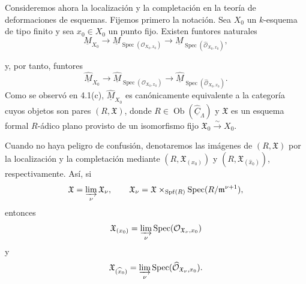 
Consideremos ahora la localización y la completación en la teoría de
deformaciones de esquemas. Fijemos primero la notación. Sea $X_0$ un
$k$-esquema de tipo finito y sea $x_0\in X_0$ un punto fijo. Existen
funtores naturales
\[
\underline M_{X_0}
\longrightarrow
\underline M_{\operatorname{Spec}(\mathcal O_{X_0,x_0})}
\longrightarrow
\underline M_{\operatorname{Spec}(\widehat{\mathcal O}_{X_0,x_0})},
\]


y, por tanto, funtores
\[
\widehat{\underline M}_{X_0}
\longrightarrow
\widehat{\underline M}_{\operatorname{Spec}(\mathcal O_{X_0,x_0})}
\longrightarrow
\widehat{\underline M}_{\operatorname{Spec}
 (\widehat{\mathcal O}_{X_0,x_0})}.
\]
Como se observó en 4.1(c), $\widehat{\underline M}_{X_0}$ es
canónicamente equivalente a la categoría cuyos objetos son pares
$(R,\mathfrak X)$, donde
$R\in\operatorname{Ob}(\widehat{\underline C}_\Lambda)$ y
$\mathfrak X$ es un esquema formal $R$-ádico plano provisto de un
isomorfismo fijo $\mathfrak X_0\xrightarrow{\sim}X_0$.

Cuando no haya peligro de confusión, denotaremos las imágenes de
$(R,\mathfrak X)$ por la localización y la completación mediante
$(R,\mathfrak X_{(x_0)})$ y
$(R,\mathfrak X_{(\widehat{x}_0)})$, respectivamente. Así, si
\[
\mathfrak X=\varinjlim_\nu\mathfrak X_\nu,
\qquad
\mathfrak X_\nu
=\mathfrak X\times_{\operatorname{Spf}(R)}
 \operatorname{Spec}(R/\mathfrak m^{\nu+1}),
\]
entonces
\[
\mathfrak X_{(x_0)}
=\varinjlim_\nu
 \operatorname{Spec}(\mathcal O_{\mathfrak X_\nu,x_0})
\]
y
\[
\mathfrak X_{(\sisi{\widehat{X}_0}{\widehat{x}_0})}
=\varinjlim_\nu
 \operatorname{Spec}(\widehat{\mathcal O}_{\mathfrak X_\nu,x_0}).
\]
